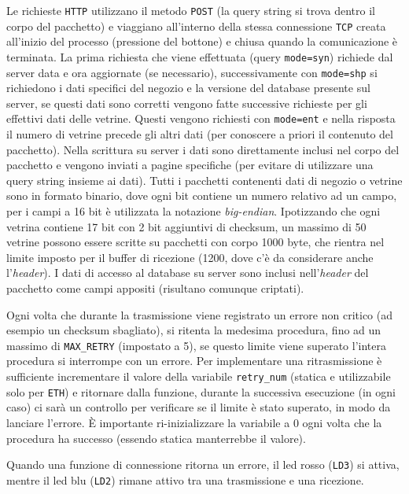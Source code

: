 Le richieste \texttt{HTTP} utilizzano il metodo \texttt{POST} (la query string si trova dentro il corpo del pacchetto) e viaggiano all'interno della stessa connessione \texttt{TCP} creata all'inizio del processo (pressione del bottone) e chiusa quando la comunicazione \`e terminata. La prima richiesta che viene effettuata (query \texttt{mode=syn}) richiede dal server data e ora aggiornate (se necessario), successivamente con \texttt{mode=shp} si richiedono i dati specifici del negozio e la versione del database presente sul server, se questi dati sono corretti vengono fatte successive richieste per gli effettivi dati delle vetrine. Questi vengono richiesti con \texttt{mode=ent} e nella risposta il numero di vetrine precede gli altri dati (per conoscere a priori il contenuto del pacchetto). Nella scrittura su server i dati sono direttamente inclusi nel corpo del pacchetto e vengono inviati a pagine specifiche (per evitare di utilizzare una query string insieme ai dati). Tutti i pacchetti contenenti dati di negozio o vetrine sono in formato binario, dove ogni bit contiene un numero relativo ad un campo, per i campi a 16 bit \`e utilizzata la notazione \textit{big-endian}.
Ipotizzando che ogni vetrina contiene 17 bit con 2 bit aggiuntivi di checksum, un massimo di 50 vetrine possono essere scritte su pacchetti con corpo 1000 byte, che rientra nel limite imposto per il buffer di ricezione (1200, dove c'\`e da considerare anche l'\textit{header}). I dati di accesso al database su server sono inclusi nell'\textit{header} del pacchetto come campi appositi (risultano comunque criptati).

Ogni volta che durante la trasmissione viene registrato un errore non critico (ad esempio un checksum sbagliato), si ritenta la medesima procedura, fino ad un massimo di \texttt{MAX\_RETRY} (impostato a 5), se questo limite viene superato l'intera procedura si interrompe con un errore. Per implementare una ritrasmissione \`e sufficiente incrementare il valore della variabile \texttt{retry\_num} (statica e utilizzabile solo per \texttt{ETH}) e ritornare dalla funzione, durante la successiva esecuzione (in ogni caso) ci sar\`a un controllo per verificare se il limite \`e stato superato, in modo da lanciare l'errore. \`E importante ri-inizializzare la variabile a 0 ogni volta che la procedura ha successo (essendo statica manterrebbe il valore).

Quando una funzione di connessione ritorna un errore, il led rosso (\texttt{LD3}) si attiva, mentre il led blu (\texttt{LD2}) rimane attivo tra una trasmissione e una ricezione.

